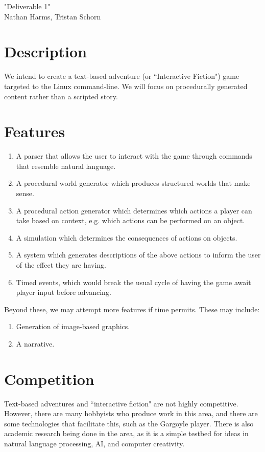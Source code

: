 \documentclass{article}
\begin{document}
\begin{center}
"Deliverable 1"\\
Nathan Harms, Tristan Schorn
\end{center}

\section{Description}
We intend to create a text-based adventure (or ``Interactive Fiction") game
targeted to the Linux command-line. We will focus on procedurally generated
content rather than a scripted story.

\section{Features}
\begin{enumerate}
  \item A parser that allows the user to interact with the game through commands
    that resemble natural language.
  \item A procedural world generator which produces structured worlds that make
    sense.
  \item A procedural action generator which determines which actions a player
    can take based on context, e.g. which actions can be performed on an object.
  \item A simulation which determines the consequences of actions on objects.
  \item A system which generates descriptions of the above actions to inform the
    user of the effect they are having.
  \item Timed events, which would break the usual cycle of having the game await
    player input before advancing.
\end{enumerate}

Beyond these, we may attempt more features if time permits. These may include:
\begin{enumerate}
  \item Generation of image-based graphics.
  \item A narrative.
\end{enumerate}

\section{Competition}
Text-based adventures and ``interactive fiction" are not highly competitive.
However, there are many hobbyists who produce work in this area, and there are
some technologies that facilitate this, such as the Gargoyle player. There is
also academic research being done in the area, as it is a simple testbed for
ideas in natural language processing, AI, and computer creativity.
\end{document}
